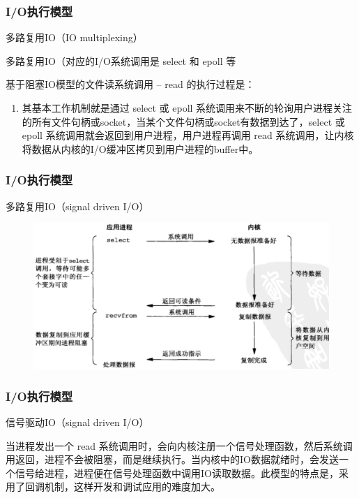 \begin{frame}[fragile]
    \frametitle{I/O执行模型}
    多路复用IO（IO multiplexing）
    
    多路复用IO（对应的I/O系统调用是 select 和 epoll 等
    
    基于阻塞IO模型的文件读系统调用 – read 的执行过程是：
    \begin{enumerate}
        
        \item 其基本工作机制就是通过 select 或 epoll 系统调用来不断的轮询用户进程关注的所有文件句柄或socket，当某个文件句柄或socket有数据到达了，select 或 epoll 系统调用就会返回到用户进程，用户进程再调用 read 系统调用，让内核将数据从内核的I/O缓冲区拷贝到用户进程的buffer中。
    \end{enumerate}       
    

    
\end{frame}
\begin{frame}[fragile]
    \frametitle{I/O执行模型}
    多路复用IO（signal driven I/O）
    \begin{figure}
        \includegraphics[width=0.7\linewidth]{figs/multi-io.png}
    \end{figure}
\end{frame}
\begin{frame}[fragile]
    \frametitle{I/O执行模型}
    信号驱动IO（signal driven I/O）
    
    
当进程发出一个 read 系统调用时，会向内核注册一个信号处理函数，然后系统调用返回，进程不会被阻塞，而是继续执行。当内核中的IO数据就绪时，会发送一个信号给进程，进程便在信号处理函数中调用IO读取数据。此模型的特点是，采用了回调机制，这样开发和调试应用的难度加大。 
    
    
    
\end{frame}
